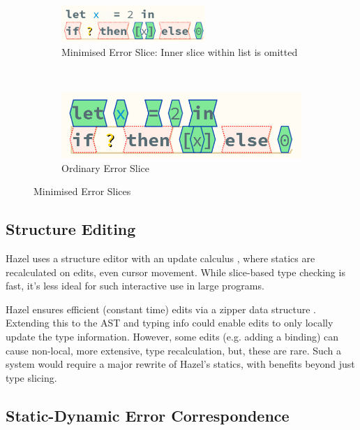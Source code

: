 \begin{figure}[h]
\centering
\begin{subfigure}[t]{0.5\textwidth}
\centering

\includegraphics[width=0.6\textwidth]{Media/Figures/partially_inconsistent_compound}
\caption{Minimised Error Slice: Inner  slice within list is omitted}
\end{subfigure}$\qquad\qquad$
\begin{subfigure}[t]{0.3\textwidth}
\centering

\includegraphics[width=1\textwidth]{Media/Figures/partially_inconsistent_compound_ordinary}
\caption{Ordinary Error Slice}
\end{subfigure}

\caption{Minimised Error Slices}
\label{fig:MinimisedSlice}
\end{figure}

\subsection{Structure Editing}\label{sec:StructureEditing}
Hazel uses a structure editor with an update calculus \cite{HazelStructureCalculus}, where statics are recalculated on edits, even cursor movement. While slice-based type checking is fast, it's less ideal for such interactive use in large programs.

Hazel ensures efficient (constant time) edits via a zipper data structure \cite{Zipper, OneHoleContext}. Extending this to the AST and typing info could enable edits to only locally update the type  information. However, some edits (e.g. adding a binding) can cause non-local, more extensive, type recalculation, but, these are rare. Such a system would require a major rewrite of Hazel's statics, with benefits beyond just type slicing.
  
\subsection{Static-Dynamic Error Correspondence}
\label{sec:ErrorCorrespondence}

